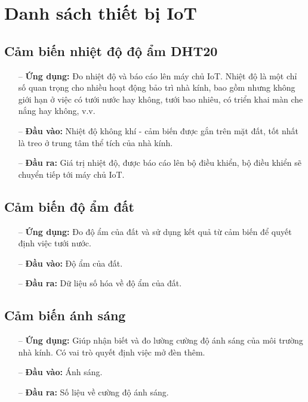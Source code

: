 \section{Danh sách thiết bị IoT}
\subsection{Cảm biến nhiệt độ độ ẩm DHT20}
\begin{itemize}
    \item [--] \textbf{Ứng dụng:} Đo nhiệt độ và báo cáo lên máy chủ IoT. Nhiệt độ là một chỉ số quan trọng cho nhiều hoạt động bảo trì nhà kính, bao gồm nhưng không giới hạn ở việc có tưới nước hay không, tưới bao nhiêu, có triển khai màn che nắng hay không, v.v. 
    \item [--] \textbf{Đầu vào:} Nhiệt độ không khí - cảm biến được gắn trên mặt đất, tốt nhất là treo ở trung tâm thể tích của nhà kính. 
    \item [--] \textbf{Đầu ra:} Giá trị nhiệt độ, được báo cáo lên bộ điều khiển, bộ điều khiển sẽ chuyển tiếp tới máy chủ IoT. 
\end{itemize}

\subsection{Cảm biến độ ẩm đất}
\begin{itemize}
    \item [--] \textbf{Ứng dụng:} Đo độ ẩm của đất và sử dụng kết quả từ cảm biến để quyết định việc tưới nước.
    \item [--] \textbf{Đầu vào:} Độ ẩm của đất.
    \item [--] \textbf{Đầu ra:} Dữ liệu số hóa về độ ẩm của đất.
\end{itemize}

\subsection{Cảm biến ánh sáng}
\begin{itemize}
    \item [--] \textbf{Ứng dụng:} Giúp nhận biết và đo lường cường độ ánh sáng của môi trường nhà kính. Có vai trò quyết định việc mở đèn thêm.
    \item [--] \textbf{Đầu vào:} Ánh sáng.
    \item [--] \textbf{Đầu ra:} Số liệu về cường độ ánh sáng.
\end{itemize}

